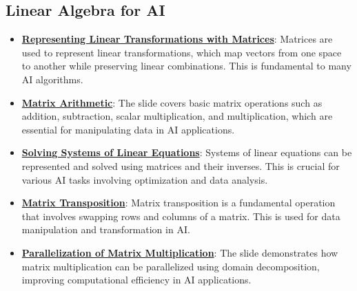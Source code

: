 \documentclass{article}%
\begin{document}
%
\subsection{Linear Algebra for AI}%
\label{subsec:LinearAlgebraforAI}%
\begin{itemize}[leftmargin=*]%
\item \href{https://purdue.brightspace.com/d2l/common/assets/pdfjs-d2l-dist/1.0.14-legacy/web/viewer.html?file=\%2Fcontent\%2Fenforced\%2F1095467-wl.202510.CS.24300.001\%2F04L1-Linear Algebra Primer.pdf\%3Fou\%3D1095467\&lang=en-us\&container=d2l-fileviewer-rendered-pdf\&fullscreen=d2l-fileviewer-rendered-pdf-dialog\&height=667#page=5}{\textbf{Representing Linear Transformations with Matrices}}: Matrices are used to represent linear transformations, which map vectors from one space to another while preserving linear combinations. This is fundamental to many AI algorithms.%
\item \href{https://purdue.brightspace.com/d2l/common/assets/pdfjs-d2l-dist/1.0.14-legacy/web/viewer.html?file=\%2Fcontent\%2Fenforced\%2F1095467-wl.202510.CS.24300.001\%2F04L1-Linear Algebra Primer.pdf\%3Fou\%3D1095467\&lang=en-us\&container=d2l-fileviewer-rendered-pdf\&fullscreen=d2l-fileviewer-rendered-pdf-dialog\&height=667#page=9}{\textbf{Matrix Arithmetic}}: The slide covers basic matrix operations such as addition, subtraction, scalar multiplication, and multiplication, which are essential for manipulating data in AI applications.%
\item \href{https://purdue.brightspace.com/d2l/common/assets/pdfjs-d2l-dist/1.0.14-legacy/web/viewer.html?file=\%2Fcontent\%2Fenforced\%2F1095467-wl.202510.CS.24300.001\%2F04L1-Linear Algebra Primer.pdf\%3Fou\%3D1095467\&lang=en-us\&container=d2l-fileviewer-rendered-pdf\&fullscreen=d2l-fileviewer-rendered-pdf-dialog\&height=667#page=11}{\textbf{Solving Systems of Linear Equations}}: Systems of linear equations can be represented and solved using matrices and their inverses. This is crucial for various AI tasks involving optimization and data analysis.%
\item \href{https://purdue.brightspace.com/d2l/common/assets/pdfjs-d2l-dist/1.0.14-legacy/web/viewer.html?file=\%2Fcontent\%2Fenforced\%2F1095467-wl.202510.CS.24300.001\%2F04L1-Linear Algebra Primer.pdf\%3Fou\%3D1095467\&lang=en-us\&container=d2l-fileviewer-rendered-pdf\&fullscreen=d2l-fileviewer-rendered-pdf-dialog\&height=667#page=16}{\textbf{Matrix Transposition}}: Matrix transposition is a fundamental operation that involves swapping rows and columns of a matrix. This is used for data manipulation and transformation in AI.%
\item \href{https://purdue.brightspace.com/d2l/common/assets/pdfjs-d2l-dist/1.0.14-legacy/web/viewer.html?file=\%2Fcontent\%2Fenforced\%2F1095467-wl.202510.CS.24300.001\%2F04L1-Linear Algebra Primer.pdf\%3Fou\%3D1095467\&lang=en-us\&container=d2l-fileviewer-rendered-pdf\&fullscreen=d2l-fileviewer-rendered-pdf-dialog\&height=667#page=18}{\textbf{Parallelization of Matrix Multiplication}}: The slide demonstrates how matrix multiplication can be parallelized using domain decomposition, improving computational efficiency in AI applications.%
\end{itemize}
\end{document}
